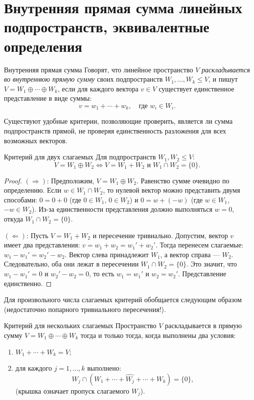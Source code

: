 
\section{Внутренняя прямая сумма линейных подпространств, эквивалентные определения}

\begin{Definition}{Внутренняя прямая сумма}{}
	Говорят, что линейное пространство $V$ \emph{раскладывается во внутреннюю прямую сумму} своих подпространств $W_1, \ldots, W_k \leq V$, и пишут $V = W_1 \oplus \cdots \oplus W_k$, если для каждого вектора $v \in V$ существует единственное представление в виде суммы:
	\[
	v = w_1 + \cdots + w_k, \quad \text{где } w_i \in W_i.
	\]
\end{Definition}

Существуют удобные критерии, позволяющие проверить, является ли сумма подпространств прямой, не проверяя единственность разложения для всех возможных векторов.

\begin{Theorem}{Критерий для двух слагаемых}{}
	Для подпространств $W_1, W_2 \leq V$:
	\[
	V = W_1 \oplus W_2 \iff V = W_1 + W_2 \text{ и } W_1 \cap W_2 = \{0\}.
	\]
\end{Theorem}

\begin{proof}
	$(\Rightarrow)$: Предположим, $V = W_1 \oplus W_2$. Равенство сумме очевидно по определению. Если $w \in W_1 \cap W_2$, то нулевой вектор можно представить двумя способами:
	$0 = 0 + 0$ (где $0 \in W_1$, $0 \in W_2$) и $0 = w + (-w)$ (где $w \in W_1$, $-w \in W_2$). Из-за единственности представления должно выполняться $w = 0$, откуда $W_1 \cap W_2 = \{0\}$.
	
	$(\Leftarrow)$: Пусть $V = W_1 + W_2$ и пересечение тривиально. Допустим, вектор $v$ имеет два представления: $v = w_1 + w_2 = w_1' + w_2'$. 
	Тогда перенесем слагаемые: $w_1 - w_1' = w_2' - w_2$.
	Вектор слева принадлежит $W_1$, а вектор справа --- $W_2$. Следовательно, оба они лежат в пересечении $W_1 \cap W_2 = \{0\}$. Это значит, что $w_1 - w_1' = 0$ и $w_2' - w_2 = 0$, то есть $w_1 = w_1'$ и $w_2 = w_2'$. Представление единственно.
\end{proof}

Для произвольного числа слагаемых критерий обобщается следующим образом (недостаточно попарного тривиального пересечения!).

\begin{Theorem}{Критерий для нескольких слагаемых}{}
	Пространство $V$ раскладывается в прямую сумму $V = W_1 \oplus \cdots \oplus W_k$ тогда и только тогда, когда выполнены два условия:
	\begin{enumerate}
		\item $W_1 + \cdots + W_k = V$;
		\item для каждого $j = 1, \dots, k$ выполнено: 
		\[
		W_j \cap (W_1 + \cdots + \widehat{W_j} + \cdots + W_k) = \{0\},
		\]
		(крышка означает пропуск слагаемого $W_j$).
	\end{enumerate}
\end{Theorem}
